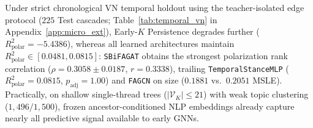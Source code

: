 \documentclass[conference]{IEEEtran}
\begin{document}
Under strict chronological VN temporal holdout using the teacher-isolated edge protocol ($225$ Test cascades; Table~\ref{tab:temporal_vn} in Appendix~\ref{app:micro_ext}), Early-$K$ Persistence degrades further ($R^2_{\text{polar}} = -5.4386$), whereas all learned architectures maintain $R^2_{\text{polar}} \in [0.0481, 0.0815]$: \texttt{SBiFAGAT} obtains the strongest polarization rank correlation ($\rho = 0.3058 \pm 0.0187$, $r = 0.3338$), trailing \texttt{TemporalStanceMLP} ($R^2_{\text{polar}} = 0.0815$, $p_{\text{adj}} = 1.00$) and \texttt{FAGCN} on size ($0.1881$ vs.\ $0.2051$ MSLE). Practically, on shallow single-thread trees ($|\mathcal{V}_K| \le 21$) with weak topic clustering ($1{,}496/1{,}500$), frozen ancestor-conditioned NLP embeddings already capture nearly all predictive signal available to early GNNs.

\end{document}
